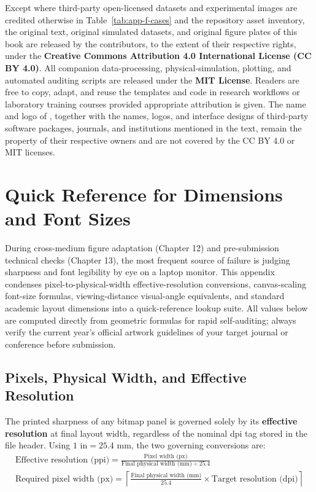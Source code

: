 Except where third-party open-licensed datasets and experimental images are credited otherwise in Table~\ref{tab:app-f-cases} and the repository asset inventory, the original text, original simulated datasets, and original figure plates of this book are released by the contributors, to the extent of their respective rights, under the \textbf{Creative Commons Attribution 4.0 International License (CC BY 4.0)}. All companion data-processing, physical-simulation, plotting, and automated auditing scripts are released under the \textbf{MIT License}. Readers are free to copy, adapt, and reuse the templates and code in research workflows or laboratory training courses provided appropriate attribution is given. The name and logo of \scidraw{}, together with the names, logos, and interface designs of third-party software packages, journals, and institutions mentioned in the text, remain the property of their respective owners and are not covered by the CC BY 4.0 or MIT licenses.

\chapter{Quick Reference for Dimensions and Font Sizes}
\label{app:size-reference}

During cross-medium figure adaptation (Chapter 12) and pre-submission technical checks (Chapter 13), the most frequent source of failure is judging sharpness and font legibility by eye on a laptop monitor. This appendix condenses pixel-to-physical-width effective-resolution conversions, canvas-scaling font-size formulas, viewing-distance visual-angle equivalents, and standard academic layout dimensions into a quick-reference lookup suite. All values below are computed directly from geometric formulas for rapid self-auditing; always verify the current year's official artwork guidelines of your target journal or conference before submission.

\section{Pixels, Physical Width, and Effective Resolution}

The printed sharpness of any bitmap panel is governed solely by its \textbf{effective resolution} at final layout width, regardless of the nominal dpi tag stored in the file header. Using $1\text{ in} = 25.4\text{ mm}$, the two governing conversions are:
\begin{gather*}
  \text{Effective resolution (ppi)} = \frac{\text{Pixel width (px)}}{\text{Final physical width (mm)} \div 25.4}\\[4pt]
  \text{Required pixel width (px)} = \left\lceil \frac{\text{Final physical width (mm)}}{25.4} \times \text{Target resolution (dpi)} \right\rceil
\end{gather*}

